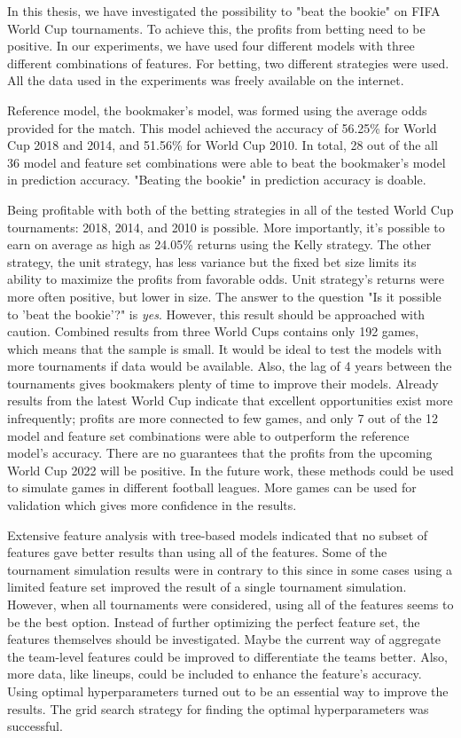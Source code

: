 In this thesis, we have investigated the possibility to "beat the bookie" on FIFA World Cup tournaments. To achieve this, the profits from betting need to be positive. In our experiments, we have used four different models with three different combinations of features. For betting, two different strategies were used. All the data used in the experiments was freely available on the internet.

Reference model, the bookmaker's model, was formed using the average odds provided for the match. This model achieved the accuracy of 56.25\% for World Cup 2018 and 2014, and 51.56\% for World Cup 2010. In total, 28 out of the all 36 model and feature set combinations were able to beat the bookmaker's model in prediction accuracy. "Beating the bookie" in prediction accuracy is doable.

Being profitable with both of the betting strategies in all of the tested World Cup tournaments: 2018, 2014, and 2010 is possible. More importantly, it's possible to earn on average as high as 24.05\% returns using the Kelly strategy. The other strategy, the unit strategy, has less variance but the fixed bet size limits its ability to maximize the profits from favorable odds. Unit strategy's returns were more often positive, but lower in size. The answer to the question
"Is it possible to 'beat the bookie'?" is \textit{yes}. However, this result should be approached with caution. Combined results from three World Cups contains only 192 games, which means that the sample is small. It would be ideal to test the models with more tournaments if data would be available.
Also, the lag of 4 years between the tournaments gives bookmakers plenty of time to improve their models. Already results from the latest World Cup indicate that excellent opportunities exist more infrequently; profits are more connected to few games, and only 7 out of the 12 model and feature set combinations were able to outperform the reference model's accuracy. There are no guarantees that the profits from the upcoming World Cup 2022 will be positive. In the future work, these methods could be used to simulate games in different football leagues. More games can be used for validation which gives more confidence in the results.

Extensive feature analysis with tree-based models indicated that no subset of features gave better results than using all of the features. Some of the tournament simulation results were in contrary to this since in some cases using a limited feature set improved the result of a single tournament simulation. However, when all tournaments were considered, using all of the features seems to be the best option. Instead of further optimizing the perfect feature set, the features themselves should be investigated. Maybe the current way of aggregate the team-level features could be improved to differentiate the teams better. Also, more data, like lineups, could be included to enhance the feature's accuracy. Using optimal hyperparameters turned out to be an essential way to improve the results. The grid search strategy for finding the optimal hyperparameters was successful.

